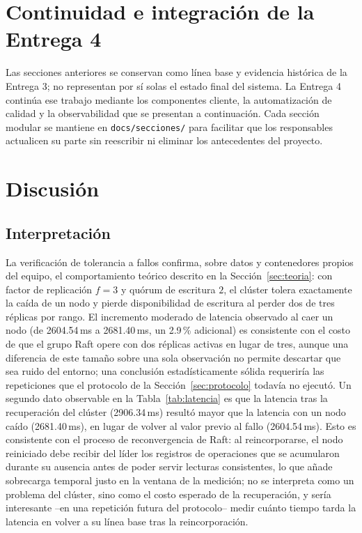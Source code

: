 \documentclass[10pt,twocolumn]{article}
\begin{document}
\section{Continuidad e integración de la Entrega 4}
\label{sec:integracion-e4}

Las secciones anteriores se conservan como línea base y evidencia histórica
de la Entrega 3; no representan por sí solas el estado final del sistema.
La Entrega 4 continúa ese trabajo mediante los componentes cliente, la
automatización de calidad y la observabilidad que se presentan a
continuación. Cada sección modular se mantiene en
\texttt{docs/secciones/} para facilitar que los responsables actualicen su
parte sin reescribir ni eliminar los antecedentes del proyecto.






\section{Discusión}
\label{sec:discusion}

\subsection{Interpretación}

La verificación de tolerancia a fallos confirma, sobre datos y
contenedores propios del equipo, el comportamiento teórico descrito en la
Sección~\ref{sec:teoria}: con factor de replicación $f=3$ y quórum de
escritura $2$, el clúster tolera exactamente la caída de un nodo y pierde
disponibilidad de escritura al perder dos de tres réplicas por rango. El
incremento moderado de latencia observado al caer un nodo (de 2604.54\,ms a
2681.40\,ms, un 2.9\,\% adicional) es consistente con el costo de que el
grupo Raft opere con dos réplicas activas en lugar de tres, aunque una
diferencia de este tamaño sobre una sola observación no permite descartar
que sea ruido del entorno; una conclusión estadísticamente sólida requeriría
las repeticiones que el protocolo de la Sección~\ref{sec:protocolo}
todavía no ejecutó. Un segundo dato observable en la Tabla~\ref{tab:latencia}
es que la latencia tras la recuperación del clúster (2906.34\,ms) resultó
mayor que la latencia con un nodo caído (2681.40\,ms), en lugar de volver
al valor previo al fallo (2604.54\,ms). Esto es consistente con el proceso
de reconvergencia de Raft: al reincorporarse, el nodo reiniciado debe
recibir del líder los registros de operaciones que se acumularon durante su
ausencia antes de poder servir lecturas consistentes, lo que añade
sobrecarga temporal justo en la ventana de la medición; no se interpreta
como un problema del clúster, sino como el costo esperado de la
recuperación, y sería interesante --en una repetición futura del
protocolo-- medir cuánto tiempo tarda la latencia en volver a su línea
base tras la reincorporación.
\end{document}
